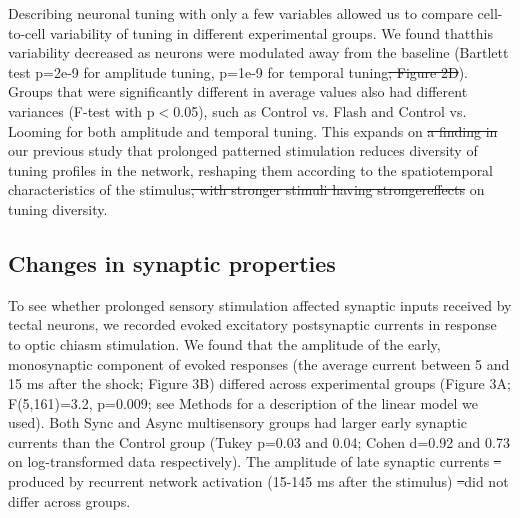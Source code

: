 \documentclass{article}
\providecommand{\DIFaddtex}[1]{{\protect\color{blue}{#1}}} %
\providecommand{\DIFdeltex}[1]{{\protect\color{red}\sout{#1}}}                      %
\providecommand{\DIFaddbegin}{} %
\providecommand{\DIFaddend}{} %
\providecommand{\DIFdelbegin}{} %
\providecommand{\DIFdelend}{} %
\providecommand{\DIFadd}[1]{\texorpdfstring{\DIFaddtex{#1}}{#1}} %
\providecommand{\DIFdel}[1]{\texorpdfstring{\DIFdeltex{#1}}{}} %
\newcommand{\DIFscaledelfig}{0.5}
\newlength{\DIFdelgraphicswidth} %
\newlength{\DIFdelgraphicsheight} %
\newcommand{\DIFaddincludegraphics}[2][]{{\color{blue}\fbox{\DIFOincludegraphics[#1]{#2}}}} %
\newcommand{\DIFdelincludegraphics}[2][]{%
\sbox{\DIFdelgraphicsbox}{\DIFOincludegraphics[#1]{#2}}%
\settoboxwidth{\DIFdelgraphicswidth}{\DIFdelgraphicsbox} %
\settoboxtotalheight{\DIFdelgraphicsheight}{\DIFdelgraphicsbox} %
\scalebox{\DIFscaledelfig}{%
\parbox[b]{\DIFdelgraphicswidth}{\usebox{\DIFdelgraphicsbox}\\[-\baselineskip] \rule{\DIFdelgraphicswidth}{0em}}\llap{\resizebox{\DIFdelgraphicswidth}{\DIFdelgraphicsheight}{%
\setlength{\unitlength}{\DIFdelgraphicswidth}%
\begin{picture}(1,1)%
\thicklines\linethickness{2pt} %
{\color[rgb]{1,0,0}\put(0,0){\framebox(1,1){}}}%
{\color[rgb]{1,0,0}\put(0,0){\line( 1,1){1}}}%
{\color[rgb]{1,0,0}\put(0,1){\line(1,-1){1}}}%
\end{picture}%
}\hspace*{3pt}}} %
} %
\DeclareRobustCommand{\DIFaddbegin}{\DIFOaddbegin \let\includegraphics\DIFaddincludegraphics} %
\DeclareRobustCommand{\DIFaddend}{\DIFOaddend \let\includegraphics\DIFOincludegraphics} %
\DeclareRobustCommand{\DIFdelbegin}{\DIFOdelbegin \let\includegraphics\DIFdelincludegraphics} %
\DeclareRobustCommand{\DIFdelend}{\DIFOaddend \let\includegraphics\DIFOincludegraphics} %
\begin{document}
Describing neuronal tuning with only a few variables \DIFaddbegin \DIFadd{also }\DIFaddend allowed us to compare cell-to-cell variability of tuning in different experimental groups. We found that\DIFaddbegin \DIFadd{, as it can be guessed from Figure 2D, }\DIFaddend this variability decreased as neurons were modulated away from the baseline (Bartlett test p=2e-9 for amplitude tuning, p=1e-9 for temporal tuning\DIFdelbegin \DIFdel{; Figure 2D}\DIFdelend ). Groups that were significantly different in average values also had different variances (F-test with p$<$0.05), such as Control vs. Flash and Control vs. Looming for both amplitude and temporal tuning. This expands on \DIFdelbegin \DIFdel{a finding in }\DIFdelend \DIFaddbegin \DIFadd{the findings of }\DIFaddend our previous study \citep{ciarleglio2015}\DIFaddbegin \DIFadd{, where we showed }\DIFaddend that prolonged patterned stimulation reduces diversity of tuning profiles in the network, reshaping them according to the spatiotemporal characteristics of the stimulus\DIFdelbegin \DIFdel{, with stronger stimuli having strongereffects }\DIFdelend \DIFaddbegin \DIFadd{. We now show that stimuli that reshape the network stronger, also have a more restrictive effect }\DIFaddend on tuning diversity.

\subsection*{Changes in synaptic properties}

To see whether prolonged sensory stimulation affected synaptic inputs received by tectal neurons, we recorded evoked excitatory postsynaptic currents in response to optic chiasm stimulation. We found that the amplitude of the early, monosynaptic component of evoked responses (the average current between 5 and 15 ms after the shock; Figure 3B) differed across experimental groups (Figure 3A; F(5,161)=3.2, p=0.009; see Methods for a description of the linear model we used). Both Sync and Async multisensory groups had larger early synaptic currents than the Control group (Tukey p=0.03 and 0.04; Cohen d=0.92 and 0.73 on log-transformed data respectively). The amplitude of late synaptic currents \DIFdelbegin \DIFdel{–}\DIFdelend produced by recurrent network activation (15-145 ms after the stimulus) \DIFdelbegin \DIFdel{–}\DIFdelend did not differ across groups.
\end{document}
